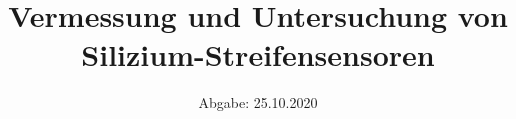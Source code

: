 

\subject{Lehrstuhlversuch im SS2020}
\title{Vermessung und Untersuchung von Silizium-Streifensensoren}
\date{%
  Abgabe: 25.10.2020
}



\maketitle
\thispagestyle{empty}
\tableofcontents
\newpage





%

%


